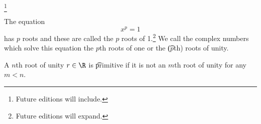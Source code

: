 
\footnote{Future editions will include.}


The equation
\[
  x^p = 1
\]
has $p$ roots and these are called the $p$ roots of 1.\footnote{Future editions will expand.}
We call the complex numbers which solve this equation the \t{$p$th roots of one} or the \t{($p$th) roots of unity}.

A $n$th root of unity $r \in \R$ is \t{primitive} if it is not an $m$th root of unity for any $m < n$.




\blankpage
